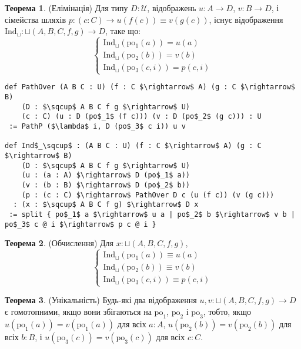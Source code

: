 \documentclass{article}
\theoremstyle{definition}
\newtheorem{theorem}{Теорема}
\begin{document}
\begin{theorem} (Елімінація)
Для типу \( D : \mathcal{U} \), відображень \( u : A \to D \), \( v : B \to D \),
і сімейства шляхів \( p : (c : C) \to u(f(c)) \equiv v(g(c)) \),
існує відображення \( \text{Ind}_\sqcup : \sqcup(A,B,C,f,g) \to D \), таке що:
\[
\begin{cases}
\text{Ind}_\sqcup(\text{po$_1$}(a)) = u(a) \\
\text{Ind}_\sqcup(\text{po$_2$}(b)) = v(b) \\
\text{Ind}_\sqcup(\text{po$_3$}(c,i)) = p(c,i)
\end{cases}
\]
\begin{lstlisting}[mathescape=true]
def PathOver (A B C : U) (f : C $\rightarrow$ A) (g : C $\rightarrow$ B)
    (D : $\sqcup$ A B C f g $\rightarrow$ U)
    (c : C) (u : D (po$_1$ (f c))) (v : D (po$_2$ (g c))) : U
 := PathP ($\lambda$ i, D (po$_3$ c i)) u v

def Ind$_\sqcup$ : (A B C : U) (f : C $\rightarrow$ A) (g : C $\rightarrow$ B)
    (D : $\sqcup$ A B C f g $\rightarrow$ U)
    (u : (a : A) $\rightarrow$ D (po$_1$ a))
    (v : (b : B) $\rightarrow$ D (po$_2$ b))
    (p : (c : C) $\rightarrow$ PathOver D c (u (f c)) (v (g c)))
  : (x : $\sqcup$ A B C f g) $\rightarrow$ D x
 := split { po$_1$ a $\rightarrow$ u a | po$_2$ b $\rightarrow$ v b | po$_3$ c @ i $\rightarrow$ p c @ i }
\end{lstlisting}
\end{theorem}

\begin{theorem} (Обчислення)
Для \( x : \sqcup(A,B,C,f,g) \),
\[
\begin{cases}
\text{Ind$_\sqcup$}(\text{po$_1$}(a)) \equiv u(a) \\
\text{Ind$_\sqcup$}(\text{po$_2$}(b)) \equiv v(b) \\
\text{Ind$_\sqcup$}(\text{po$_3$}(c,i)) \equiv p(c,i)
\end{cases}
\]
\end{theorem}

\begin{theorem} (Унікальність)
Будь-які два відображення \( u, v : \sqcup(A,B,C,f,g) \to D \) є гомотопними,
якщо вони збігаються на \( \text{po}_1 \), \( \text{po}_2 \) і \( \text{po}_3 \), тобто,
якщо \( u(\text{po}_1(a)) = v(\text{po}_1(a)) \) для всіх \( a : A \), \( u(\text{po}_2(b)) = v(\text{po}_2(b)) \)
для всіх \( b : B \), і \( u(\text{po}_3(c)) = v(\text{po}_3(c)) \) для всіх \( c : C \).
\end{theorem}
\end{document}
